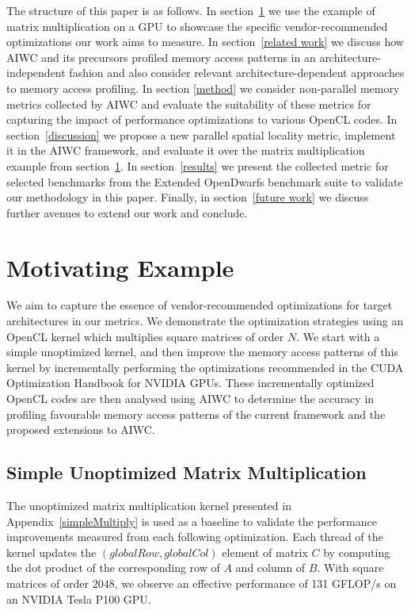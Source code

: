 \documentclass[review=false, sigchi]{acmart}
\begin{document}
	The structure of this paper is as follows.
	In section~\ref{motivating example} we use the example of matrix multiplication on a GPU to showcase the specific vendor-recommended optimizations our work aims to measure.
	In section~\ref{related work} we discuss how AIWC and its precursors profiled memory access patterns in an architecture-independent fashion and also consider relevant architecture-dependent approaches to memory access profiling.
	In section \ref{method} we consider non-parallel memory metrics collected by AIWC and evaluate the suitability of these metrics for capturing the impact of performance optimizations to various OpenCL codes.
	In section~\ref{discussion} we propose a new parallel spatial locality metric, implement it in the AIWC framework, and evaluate it over the matrix multiplication example from section~\ref{motivating example}.
	In section~\ref{results} we present the collected metric for selected benchmarks from the Extended OpenDwarfs benchmark suite to validate our methodology in this paper.
	Finally, in section~\ref{future work} we discuss further avenues to extend our work and conclude.
	
	\section{Motivating Example} \label{motivating example}
	
	We aim to capture the essence of vendor-recommended optimizations for target architectures in our metrics.
	We demonstrate the optimization strategies using an OpenCL kernel which multiplies square matrices of order $N$.
	We start with a simple unoptimized kernel, and then improve the memory access patterns of this kernel by incrementally performing the optimizations recommended in the CUDA Optimization Handbook \cite{cudaoptimisation} for NVIDIA GPUs.
	These incrementally optimized OpenCL codes are then analysed using AIWC to determine the accuracy in profiling favourable memory access patterns of the current framework and the proposed extensions to AIWC.
	
	\subsection{Simple Unoptimized Matrix Multiplication}
	
	The unoptimized matrix multiplication kernel presented in Appendix~\ref{simpleMultiply} is used as a baseline to validate the performance improvements measured from each following optimization.
	Each thread of the kernel updates the $(globalRow, globalCol)$ element of matrix $C$ by computing the dot product of the corresponding row of $A$ and column of $B$. With square matrices of order $2048$, we observe an effective performance of 131 GFLOP/s on an NVIDIA Tesla P100 GPU.
	
\end{document}
